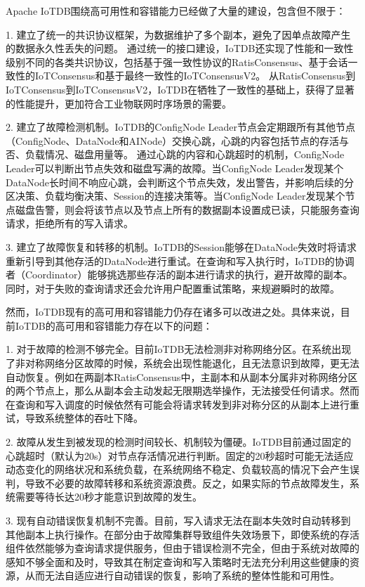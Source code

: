 Apache IoTDB围绕高可用性和容错能力已经做了大量的建设，包含但不限于：

1. 建立了统一的共识协议框架，为数据维护了多个副本，避免了因单点故障产生的数据永久性丢失的问题。
通过统一的接口建设，IoTDB还实现了性能和一致性级别不同的各类共识协议，包括基于强一致性协议的RatisConsensus、基于会话一致性的IoTConsensus和基于最终一致性的IoTConsensusV2。
从RatisConsensus到IoTConsensus到IoTConsensusV2，IoTDB在牺牲了一致性的基础上，获得了显著的性能提升，更加符合工业物联网时序场景的需要。


2. 建立了故障检测机制。IoTDB的ConfigNode Leader节点会定期跟所有其他节点（ConfigNode、DataNode和AINode）交换心跳，心跳的内容包括节点的存活与否、负载情况、磁盘用量等。
通过心跳的内容和心跳超时的机制，ConfigNode Leader可以判断出节点失效和磁盘写满的故障。当ConfigNode Leader发现某个DataNode长时间不响应心跳，会判断这个节点失效，发出警告，并影响后续的分区决策、负载均衡决策、Session的连接决策等。当ConfigNode Leader发现某个节点磁盘告警，则会将该节点以及节点上所有的数据副本设置成已读，只能服务查询请求，拒绝所有的写入请求。

3. 建立了故障恢复和转移的机制。IoTDB的Session能够在DataNode失效时将请求重新引导到其他存活的DataNode进行重试。在查询和写入执行时，IoTDB的协调者（Coordinator）能够挑选那些存活的副本进行请求的执行，避开故障的副本。同时，对于失败的查询请求还会允许用户配置重试策略，来规避瞬时的故障。


然而，IoTDB现有的高可用和容错能力仍存在诸多可以改进之处。具体来说，目前IoTDB的高可用和容错能力存在以下的问题：

1. 对于故障的检测不够完全。目前IoTDB无法检测非对称网络分区。在系统出现了非对称网络分区故障的时候，系统会出现性能退化，且无法意识到故障，更无法自动恢复。例如在两副本RatisConsensus中，主副本和从副本分属非对称网络分区的两个节点上，那么从副本会主动发起无限期选举操作，无法接受任何请求。然而在查询和写入调度的时候依然有可能会将请求转发到非对称分区的从副本上进行重试，导致系统整体的吞吐下降。


2. 故障从发生到被发现的检测时间较长、机制较为僵硬。IoTDB目前通过固定的心跳超时（默认为20s）对节点存活情况进行判断。固定的20秒超时可能无法适应动态变化的网络状况和系统负载，在系统网络不稳定、负载较高的情况下会产生误判，导致不必要的故障转移和系统资源浪费。反之，如果实际的节点故障发生，系统需要等待长达20秒才能意识到故障的发生。

3. 现有自动错误恢复机制不完善。目前，写入请求无法在副本失效时自动转移到其他副本上执行操作。在部分由于故障集群导致组件失效场景下，即使系统的存活组件依然能够为查询请求提供服务，但由于错误检测不完全，但由于系统对故障的感知不够全面和及时，导致其在制定查询和写入策略时无法充分利用这些健康的资源，从而无法自适应进行自动错误的恢复，影响了系统的整体性能和可用性。


